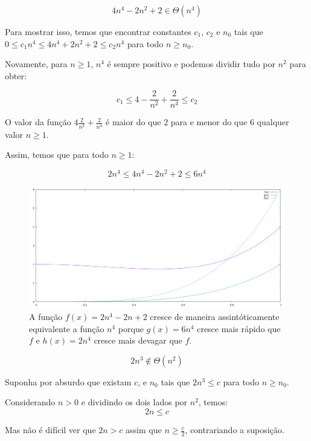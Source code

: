 \begin{example}
  \begin{displaymath}
    4  n^4 - 2 n^2 + 2 \in \Theta(n^4) 
  \end{displaymath}

   Para mostrar isso, temos que encontrar constantes $c_1$, $c_2$ e $n_0$ tais que $0 \leq c_1 n^4 \leq 4 n^4 + 2 n^2 + 2 \leq c_2 n^4$ para todo $n \geq n_0$.

   Novamente, para $n \geq 1$, $n^4$ é sempre positivo e podemos dividir tudo por $n^2$ para obter:

  \begin{displaymath}
   c_1 \leq 4 - \frac{2}{n^2} + \frac{2}{n^4} \leq c_2
  \end{displaymath}

  O valor da função $4  \frac{2}{n^2} + \frac{2}{n^4}$ é maior do que $2$ para e menor do que $6$ qualquer valor $n \geq 1$.

  Assim, temos que para todo $n \geq 1$:

  \begin{displaymath}
   2n^4 \leq 4n^4 -2n^2  + 2 \leq 6n^4
  \end{displaymath}

  \begin{figure}
\includegraphics[width=\textwidth]{imagens/grafico6.png}
\caption{A função $f(x) = 2n^4 - 2n + 2$ cresce de maneira assintóticamente equivalente a função $n^4$ porque $g(x) = 6n^4$ cresce mais rápido que $f$ e $h(x) = 2n^4$ cresce mais devagar que $f$.}
\end{figure}

  
\end{example}

\begin{example}
  \begin{displaymath}
  2n^3 \notin \Theta(n^2)
  \end{displaymath}

  Suponha por absurdo que existam $c$, e $n_0$ tais que $2n^3 \leq c$ para todo $n \geq n_0$.

  Considerando $n > 0$ e dividindo os dois lados por $n^2$, temos:
  \begin{displaymath}
    2n \leq c
  \end{displaymath}

  Mas não é difícil ver que $2n > c$ assim que $n \geq \frac{c}{2}$, contrariando a suposição.
\end{example}

